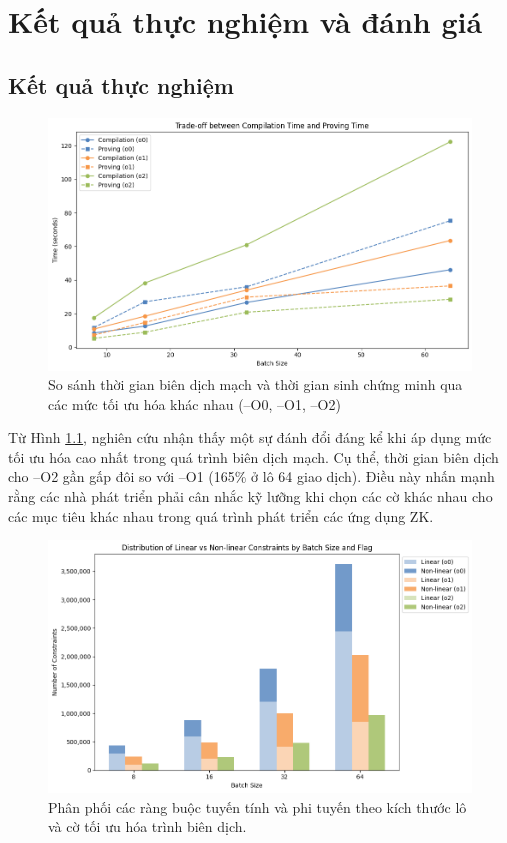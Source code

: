 \chapter{Kết quả thực nghiệm và đánh giá}
\label{chap:chap5}
\section{Kết quả thực nghiệm}
\begin{figure}[h]
    \centering
    \includegraphics[width=\textwidth]{imgs/compilation_proving_time.png}
    \caption{So sánh thời gian biên dịch mạch và thời gian sinh chứng minh qua các mức tối ưu hóa khác nhau (--O0, --O1, --O2)}
    \label{fig:chapter5-compilation_proving_time}
\end{figure}

Từ Hình \ref{fig:chapter5-compilation_proving_time}, nghiên cứu nhận thấy một sự đánh đổi đáng kể khi áp dụng mức tối ưu hóa cao nhất trong quá trình biên dịch mạch. Cụ thể, thời gian biên dịch cho --O2 gần gấp đôi so với --O1 (165\% ở lô 64 giao dịch). Điều này nhấn mạnh rằng các nhà phát triển phải cân nhắc kỹ lưỡng khi chọn các cờ khác nhau cho các mục tiêu khác nhau trong quá trình phát triển các ứng dụng ZK.

\begin{figure}[H]
    \centering
    \includegraphics[width=\textwidth]{imgs/constraint_batchsize.png}
    \caption{Phân phối các ràng buộc tuyến tính và phi tuyến theo kích thước lô và cờ tối ưu hóa trình biên dịch.}
    \label{fig:chapter5-constraint_distribution}
\end{figure}

